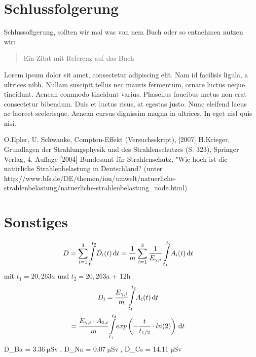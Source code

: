 \documentclass[aps,twocolumn,secnumarabic,nobalancelastpage,amsmath,amssymb,
nofootinbib,superscriptaddress]{revtex4-1}
\begin{document}
\section{Schlussfolgerung}

Schlussoflgerung, sollten wir mal was von nem Buch oder so entnehmen nutzen wir:


\begin{quote}
  Ein Zitat mit Referenz auf das Buch\cite{melissinos1966}
\end{quote}

Lorem ipsum dolor sit amet, consectetur adipiscing elit. Nam id facilisis ligula,
a ultrices nibh. Nullam suscipit tellus nec mauris fermentum, ornare luctus neque
tincidunt. Aenean commodo tincidunt varius. Phasellus faucibus metus non erat
consectetur bibendum. Duis et luctus risus, at egestas justo. Nunc eleifend lacus
ac laoreet scelerisque. Aenean cursus dignissim magna in ultrices. In eget nisl
quis nisi.




\begin{thebibliography}{99}
O.Epler, U. Schwanke, Compton-Effekt (Versuchsskript),  [2007]
H.Krieger, Grundlagen der Strahlungsphysik und des Strahlenschutzes (S. 323), Springer Verlag, 4. Auflage [2004]
Bundesamt für Strahlenschutz, "Wie hoch ist die natürliche Strahlenbelastung in Deutschland?\grqq\: (unter http://www.bfs.de/DE/themen/ion/umwelt/natuerliche-strahlenbelastung/natuerliche-strahlenbelastung_node.html)
\end{thebibliography}


\clearpage
\appendix

\section{Sonstiges}

\begin{equation}
  D = \sum\limits_{i=1}^3 \int\limits_{t_1}^{t_2} \! \dot{D_i}(t) \, \mathrm{d}t = \frac{1}{m}\sum\limits_{i=1}^3
  \frac{1}{E_{\gamma,i}} \int\limits_{t_1}^{t_2} \! A_{i}(t) \, \mathrm{d}t  \newline
\end{equation}
mit $t_1 = 20,263a$ und $t_2 = 20,263a$ + 12h
\begin{equation}
  \begin{gathered}
    D_i = \cfrac{E_{\gamma,i}}{m} \int\limits_{t_1}^{t_2} \! A_i(t) \, \mathrm{d}t \\
    = \cfrac{E_{\gamma,i}\cdot A_{0,i}}{m} \int\limits_{t_1}^{t_2} \! exp\left(-\frac{t}{t_{1/2}}\cdot ln(2)\right) \, \mathrm{d}t
  \end{gathered}
\end{equation}
\Rightarrow D_{Ba} = 3.36\:$\upmu\text{Sv}$,\: D_{Na} = 0.07\:$\upmu\text{Sv}$,\: D_{Cs} = 14.11\:$\upmu\text{Sv}$
\vspace{3em}
\end{document}

